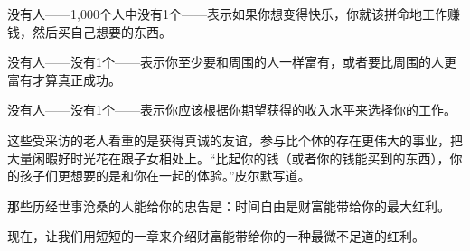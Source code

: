 {\kaishu

没有人——1,000个人中没有1个——表示如果你想变得快乐，你就该拼命地工作赚钱，然后买自己想要的东西。

没有人——没有1个——表示你至少要和周围的人一样富有，或者要比周围的人更富有才算真正成功。

没有人——没有1个——表示你应该根据你期望获得的收入水平来选择你的工作。

}

这些受采访的老人看重的是获得真诚的友谊，参与比个体的存在更伟大的事业，把大量闲暇好时光花在跟子女相处上。“比起你的钱（或者你的钱能买到的东西），你的孩子们更想要的是和你在一起的体验。”皮尔默写道。

那些历经世事沧桑的人能给你的忠告是：时间自由是财富能带给你的最大红利。

现在，让我们用短短的一章来介绍财富能带给你的一种最微不足道的红利。
